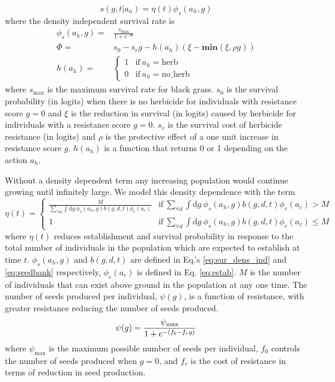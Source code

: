 \documentclass[12pt, a4paper]{article}
\begin{document}
\begin{equation}
\label{eq:survival}
	s(g, t|a_n) = \eta(t)\phi_s(a_h, g) 
\end{equation}   
where the density independent survival rate is 
\begin{align}\label{eq:sur_dens_ind}
	\phi_s(a_h, g) =& \frac{s_\text{max}}{1 + e^{-\Phi}}\\
	\Phi =& s_0 - s_rg - h(a_h)\left(\xi - \textbf{min}(\xi, \rho g) \right)\\
	h(a_h) =& \begin{cases}
		1 &\text{if}~a_h = \text{herb}\\
		0 &\text{if}~a_h = \text{no\_herb}
	\end{cases} 
\end{align}
where $s_\text{max}$ is the maximum survival rate for black grass. $s_0$ is the survival probability (in logits) when there is no herbicide for individuals with resistance score $g = 0$ and $\xi$ is the reduction in survival (in logits) caused by herbicide for individuals with a resistance score $g = 0$. $s_r$ is the survival cost of herbicide resistance (in logits) and $\rho$ is the protective effect of a one unit increase in resistance score $g$. $h(a_h)$ is a function that returns 0 or 1 depending on the action $a_h$.

Without a density dependent term any increasing population would continue growing until infinitely large. We model this density dependence with the term 
\begin{equation}\label{eq:density_dependence}
	\eta(t) =
		\begin{cases}
			\frac{M}{\sum_{\forall d}\int \text{d}g~ \phi_s(a_h, g)b(g, d, t)\phi_e(a_c)} &\text{if}~ \sum_{\forall d}\int \text{d}g~ \phi_s(a_h, g)b(g, d, t)\phi_e(a_c) > M \\
			1 &\text{if}~ \sum_{\forall d}\int \text{d}g~ \phi_s(a_h, g)b(g, d, t)\phi_e(a_c) \leq M  
		\end{cases}
\end{equation}
where $\eta(t)$ reduces establishment and survival probability in response to the total number of individuals in the population which are expected to establish at time $t$. $\phi_s(a_h, g)$ and $b(g, d, t)$ are defined in Eq.'s \ref{eq:sur_dens_ind} and \ref{eq:seedbank} respectively, $\phi_e(a_c)$ is defined in Eq. \ref{eq:estab}. $M$ is the number of individuals that can exist above ground in the population at any one time. The number of seeds produced per individual, $\psi(g)$, is a function of resistance, with greater resistance reducing the number of seeds produced. 
\begin{equation}\label{eq:seed_production}
	\psi(g) = \frac{\psi_\text{max}}{1 + e^{-(f_0 - f_rg)}}\\
\end{equation}  
where $\psi_\text{max}$ is the maximum possible number of seeds per individual, $f_0$ controls the number of seeds produced when $g = 0$, and $f_r$ is the cost of resistance in terms of reduction in seed production.
\end{document}
